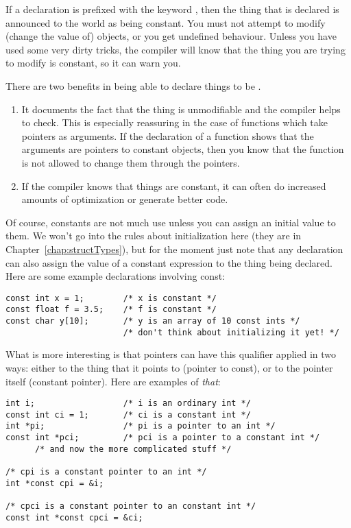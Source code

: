    If a declaration is prefixed with the keyword \const, then
    the thing that is declared is announced to the world as being constant.
    You must not attempt to modify (change the value of) \const{}
    objects, or you get undefined behaviour. Unless you have used some very
    dirty tricks, the compiler will know that the thing you are trying to
    modify is constant, so it can warn you.


   There are two benefits in being able to declare things to be
    \const.


   \begin{enumerate}
    \item It documents the fact that the thing is unmodifiable and the
     compiler helps to check. This is especially reassuring in the case
     of functions which take pointers as arguments. If the declaration
     of a function shows that the arguments are pointers to constant
     objects, then you know that the function is not allowed to change
     them through the pointers.

    \item If the compiler knows that things are constant, it can often do
     increased amounts of optimization or generate better code.
   \end{enumerate}

   Of course, constants are not much use unless you can assign an initial
    value to them. We won't go into the rules about initialization here
    (they are in Chapter~\ref{chap:structTypes}),
    but for the moment just note that
    any declaration can also assign the value of a constant expression to
    the thing being declared. Here are some example declarations involving
    const:


   \begin{Verbatim}
const int x = 1;        /* x is constant */
const float f = 3.5;    /* f is constant */
const char y[10];       /* y is an array of 10 const ints */
                        /* don't think about initializing it yet! */
\end{Verbatim}

   What is more interesting is that pointers can have this qualifier
    applied in two ways: either to the thing that it points to (pointer to
    const), or to the pointer itself (constant pointer). Here are examples
    of \textit{that}:


   \begin{Verbatim}
int i;                  /* i is an ordinary int */
const int ci = 1;       /* ci is a constant int */
int *pi;                /* pi is a pointer to an int */
const int *pci;         /* pci is a pointer to a constant int */
      /* and now the more complicated stuff */

/* cpi is a constant pointer to an int */
int *const cpi = &i;

/* cpci is a constant pointer to an constant int */
const int *const cpci = &ci;
\end{Verbatim}

